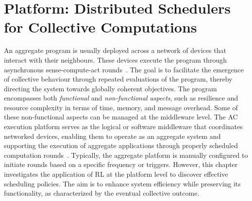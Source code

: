 \newcommand{\export}{export}
\newcommand{\round}{round}

\newcommand{\decision}[1]{{\color{red} #1}}
\newcommand{\mtext}[1]{\text{\texttt{#1}}}
\newenvironment{iequation}{\(}{\). }
\def\tablename{Table}
\sloppypar

\newcommand{\scafiinline}[1]{\lstinline[language=scafi]$#1$}


\chapter[Platform: Distributed Schedulers for Collective Computations]{
    Platform: Distributed Schedulers for Collective Computations
}\label{chap:rl:schedulers}%
\minitoc%
%

An aggregate program is usually deployed across a network of devices that interact with their neighbours. These devices execute the program through asynchronous sense-compute-act rounds~\cite{DBLP:journals/fi/CasadeiPPVW20}.
The goal is to facilitate the emergence of collective behaviour through repeated evaluations of the program, thereby directing the system towards globally coherent objectives.
%
The program encompasses both \emph{functional} and \emph{non-functional aspects}, 
 such as resilience and resource complexity in terms of time, memory, and message overhead. 
 Some of these non-functional aspects can be managed at the middleware level. %
The \ac{AC} execution platform serves as the logical or software middleware that coordinates networked devices, 
 enabling them to operate as an aggregate system and supporting the execution of aggregate applications through properly scheduled computation rounds~\cite{danilo2021lmcs}. %
%
Typically, the aggregate platform is manually configured to initiate rounds based on a specific frequency or triggers. %
However, this chapter investigates the application of \ac{RL} at the platform level to discover effective scheduling policies. 
 The aim is to enhance system efficiency while preserving its functionality, as characterized by the eventual collective outcome. %

